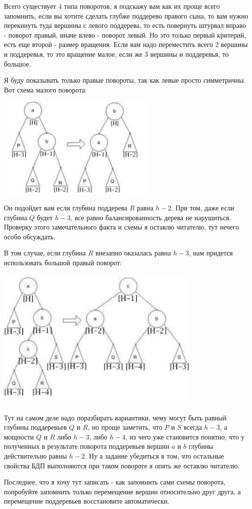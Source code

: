 Всего существует 4 типа поворотов, я подскажу вам как их проще всего запомнить, если вы хотите сделать глубже поддерево правого сына, то вам нужно перекинуть туда вершины с левого поддерева, то есть повернуть штурвал вправо - поворот правый, иначе влево - поворот левый. Но это только первый критерий, есть еще второй - размер вращения. Если вам надо переместить всего 2 вершины и поддеревья, то это вращение малое, если же 3 вершины и поддеревья, то большое.

Я буду показывать только правые повороты, так как левые просто симметричны. Вот схема малого поворота:
\begin{center}
    \includegraphics[width=8cm, height=5cm]{assets/avl_balance1.jpg}
\end{center}
Он подойдет вам если глубина поддерева $R$ равна $h-2$. При том, даже если глубина $Q$ будет $h-3$, все равно балансированность дерева не нарушиться. Проверку этого замечательного факта и схемы я оставлю читателю, тут нечего особо обсуждать.
 
В том случае, если глубина $R$ внезапно оказалась равна $h-3$, нам придется использовать большой правый поворот:
\begin{center}
    \includegraphics[width=10cm, height=7cm]{assets/avl_balance2.jpg}
\end{center}

Тут на самом деле надо поразбирать вариантики, чему могут быть равный глубины поддеревьев $Q$ и $R$, но проще заметить, что $P$ и $S$ всегда $h-3$, а мощности $Q$ и $R$ либо $h-3$, либо $h-4$, из чего уже становится понятно, что у полученных в результате поворота поддеревьев вершин $a$ и $b$ глубины действительно равны $h-2$. Ну а задание убедиться в том, что остальные свойства БДП выполняются при таком повороте я опять же оставлю читателю.

Последнее, что я хочу тут записать - как запомнить сами схемы поворота, попробуйте запомнить только перемещение вершин относительно друг друга, а перемещение поддеревьев восстановите автоматически. 